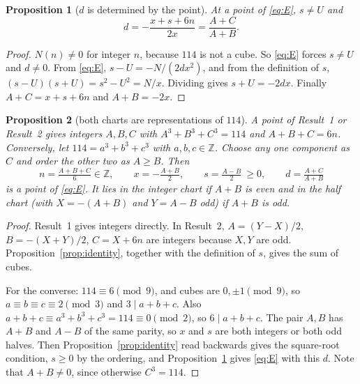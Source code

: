 \documentclass[11pt,a4paper]{article}
\newtheorem{proposition}{Proposition}
\theoremstyle{remark}
\begin{document}
\begin{proposition}[$d$ is determined by the point]\label{prop:d}
At a point of \eqref{eq:E}, $s\neq U$ and
\[
  d=-\frac{x+s+6n}{2x}=\frac{A+C}{A+B}.
\]
\end{proposition}
\begin{proof}
$N(n)\neq0$ for integer $n$, because $114$ is not a cube. So \eqref{eq:E} forces $s\neq U$
and $d\ne0$. From \eqref{eq:E}, $s-U=-N/(2dx^2)$, and from the definition of $s$,
$(s-U)(s+U)=s^2-U^2=N/x$. Dividing gives $s+U=-2dx$. Finally $A+C=x+s+6n$ and $A+B=-2x$.
\end{proof}

\begin{proposition}[both charts are representations of $114$]\label{prop:charts}
A point of Result~1 or Result~2 gives integers $A,B,C$ with $A^3+B^3+C^3=114$ and
$A+B+C=6n$. Conversely, let $114=a^3+b^3+c^3$ with $a,b,c\in\mathbb Z$. Choose any one
component as $C$ and order the other two as $A\ge B$. Then
\[
  n=\tfrac{A+B+C}{6}\in\mathbb Z,\qquad x=-\tfrac{A+B}{2},\qquad s=\tfrac{A-B}{2}\ \ge 0,\qquad
  d=\tfrac{A+C}{A+B}
\]
is a point of \eqref{eq:E}. It lies in the integer chart if $A+B$ is even and in the half
chart (with $X=-(A+B)$ and $Y=A-B$ odd) if $A+B$ is odd.
\end{proposition}
\begin{proof}
Result~1 gives integers directly. In Result~2, $A=(Y-X)/2$, $B=-(X+Y)/2$, $C=X+6n$ are
integers because $X,Y$ are odd. Proposition~\ref{prop:identity}, together with the
definition of $s$, gives the sum of cubes.

For the converse: $114\equiv 6\pmod 9$, and cubes are $0,\pm1\pmod9$, so
$a\equiv b\equiv c\equiv 2\pmod3$ and $3\mid a+b+c$. Also
$a+b+c\equiv a^3+b^3+c^3=114\equiv0\pmod2$, so $6\mid a+b+c$. The pair $A,B$ has $A+B$ and
$A-B$ of the same parity, so $x$ and $s$ are both integers or both odd halves. Then
Proposition~\ref{prop:identity} read backwards gives the square-root condition, $s\ge0$ by
the ordering, and Proposition~\ref{prop:d} gives \eqref{eq:E} with this $d$. Note that
$A+B\neq0$, since otherwise $C^3=114$.
\end{proof}
\end{document}
